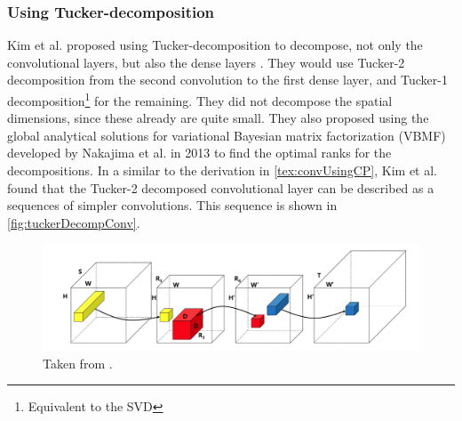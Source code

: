 \subsubsection{Using Tucker-decomposition}
Kim et al. proposed using Tucker-decomposition to decompose, not only the convolutional layers, but also the dense layers \cite{Kim2016}. They would use Tucker-2 decomposition from the second convolution to the first dense layer, and Tucker-1 decomposition\footnote{Equivalent to the SVD} for the remaining. They did not decompose the spatial dimensions, since these already are quite small. They also proposed using the global analytical solutions for variational Bayesian matrix factorization (VBMF) developed by Nakajima et al. in 2013 \cite{Nakajima2013} to find the optimal ranks for the decompositions. In a similar to the derivation in \autoref{tex:convUsingCP}, Kim et al. found that the Tucker-2 decomposed convolutional layer can be described as a sequences of simpler convolutions. This sequence is shown in \autoref{fig:tuckerDecompConv}. 

\begin{figure}
    \centering
    \includegraphics[width=\linewidth]{Pics/02_Previous_work/tuckerDecomp.png}
    \caption{Taken from \cite{Kim2016}. }
    \label{fig:tuckerDecompConv}
\end{figure}
